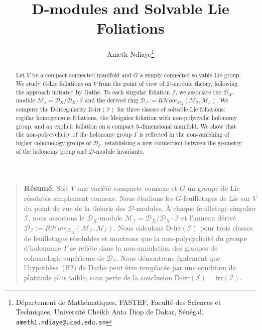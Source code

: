 \documentclass[12pt,a4paper]{article}
\title{\textbf{D-modules and Solvable Lie Foliations}}
\author{
Ameth Ndiaye\thanks{D\'epartement de Math\'ematiques, FASTEF,
Facult\'e des Sciences et Techniques,
Universit\'e Cheikh Anta Diop de Dakar, S\'en\'egal.
\texttt{ameth1.ndiaye@ucad.edu.sn}}}
\date{}
\begin{document}
\maketitle

\begin{abstract}
Let $V$ be a compact connected manifold and $G$ a simply connected solvable Lie group.
We study $G$-Lie foliations on $V$ from the point of view of $\mathcal{D}$-module
theory, following the approach initiated by Dathe. To each singular foliation
$\mathcal{I}$, we associate the $\mathcal{D}_X$-module
$\mathcal{M}_{\mathcal{I}} = \mathcal{D}_X / \mathcal{D}_X \cdot \mathcal{I}$
and the derived ring
$\mathcal{D}_{\mathcal{I}} :=
R\mathcal{H}om_{\mathcal{D}_X}(\mathcal{M}_{\mathcal{I}},
\mathcal{M}_{\mathcal{I}})$.
We compute the D-irregularity $\mathrm{D\text{-}irr}(\mathcal{I})$ for three
classes of solvable Lie foliations: regular homogeneous foliations, the Meigniez
foliation with non-polycyclic holonomy group, and an explicit foliation on a compact
5-dimensional manifold. We show that the non-polycyclicity of the holonomy group
$\Gamma$ is reflected in the non-vanishing of higher cohomology groups of
$\mathcal{D}_{\mathcal{I}}$, establishing a new connection between the geometry
of the holonomy group and $\mathcal{D}$-module invariants.
\end{abstract}
\begin{quote}
\textbf{R\'esum\'e.}
Soit $V$ une vari\'et\'e compacte connexe et $G$ un groupe de Lie r\'esoluble
simplement connexe. Nous \'etudions les $G$-feuilletages de Lie sur $V$ du
point de vue de la th\'eorie des $\mathcal{D}$-modules. \`A chaque feuilletage
singulier $\mathcal{I}$, nous associons le $\mathcal{D}_X$-module
$\mathcal{M}_{\mathcal{I}} = \mathcal{D}_X / \mathcal{D}_X \cdot \mathcal{I}$
et l'anneau d\'eriv\'e
$\mathcal{D}_{\mathcal{I}} :=
R\mathcal{H}om_{\mathcal{D}_X}(\mathcal{M}_{\mathcal{I}},
\mathcal{M}_{\mathcal{I}})$.
Nous calculons $\mathrm{D\text{-}irr}(\mathcal{I})$ pour trois classes de
feuilletages r\'esolubles et montrons que la non-polycyclicit\'e du groupe
d'holonomie $\Gamma$ se refl\`ete dans la non-annulation des groupes de
cohomologie sup\'erieurs de $\mathcal{D}_{\mathcal{I}}$. Nous d\'emontrons
\'egalement que l'hypoth\`ese~(H2) de Dathe peut \^etre remplac\'ee par
une condition de platitude plus faible, sans perte de la conclusion
$\mathrm{D\text{-}irr}(\mathcal{I}) = \mathrm{irr}(\mathcal{I})$.
\end{quote}
\end{document}
